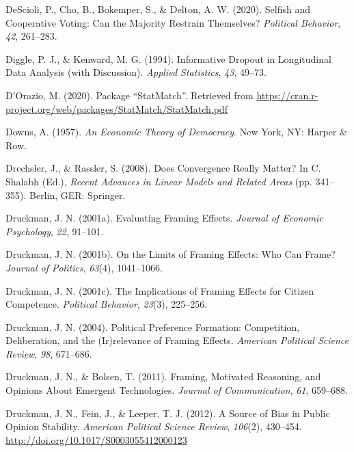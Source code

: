 \documentclass[12pt,econ]{sources/authesis}
\begin{document}
\leavevmode\hypertarget{ref-descioli_2020_selfish}{}%
DeScioli, P., Cho, B., Bokemper, S., \& Delton, A. W. (2020). Selfish and Cooperative Voting: Can the Majority Restrain Themselves? \emph{Political Behavior}, \emph{42}, 261--283.

\leavevmode\hypertarget{ref-diggle_1994_informative}{}%
Diggle, P. J., \& Kenward, M. G. (1994). Informative Dropout in Longitudinal Data Analysis (with Discussion). \emph{Applied Statistics}, \emph{43}, 49--73.

\leavevmode\hypertarget{ref-dorazio_2020_package}{}%
D'Orazio, M. (2020). Package ``StatMatch''. Retrieved from \url{https://cran.r-project.org/web/packages/StatMatch/StatMatch.pdf}

\leavevmode\hypertarget{ref-downs_economic_1957}{}%
Downs, A. (1957). \emph{An Economic Theory of Democracy}. New York, NY: Harper \& Row.

\leavevmode\hypertarget{ref-drechsler_2008_does}{}%
Drechsler, J., \& Rassler, S. (2008). Does Convergence Really Matter? In C. Shalabh (Ed.), \emph{Recent Advances in Linear Models and Related Areas} (pp. 341--355). Berlin, GER: Springer.

\leavevmode\hypertarget{ref-druckman_evaluating_2001}{}%
Druckman, J. N. (2001a). Evaluating Framing Effects. \emph{Journal of Economic Psychology}, \emph{22}, 91--101.

\leavevmode\hypertarget{ref-druckman_limits_2001}{}%
Druckman, J. N. (2001b). On the Limits of Framing Effects: Who Can Frame? \emph{Journal of Politics}, \emph{63}(4), 1041--1066.

\leavevmode\hypertarget{ref-druckman_implications_2001}{}%
Druckman, J. N. (2001c). The Implications of Framing Effects for Citizen Competence. \emph{Political Behavior}, \emph{23}(3), 225--256.

\leavevmode\hypertarget{ref-druckman_2004_political}{}%
Druckman, J. N. (2004). Political Preference Formation: Competition, Deliberation, and the (Ir)relevance of Framing Effects. \emph{American Political Science Review}, \emph{98}, 671--686.

\leavevmode\hypertarget{ref-druckman_framing_2011}{}%
Druckman, J. N., \& Bolsen, T. (2011). Framing, Motivated Reasoning, and Opinions About Emergent Technologies. \emph{Journal of Communication}, \emph{61}, 659--688.

\leavevmode\hypertarget{ref-druckman_source_2012}{}%
Druckman, J. N., Fein, J., \& Leeper, T. J. (2012). A Source of Bias in Public Opinion Stability. \emph{American Political Science Review}, \emph{106}(2), 430--454. \url{http://doi.org/10.1017/S0003055412000123}
\end{document}
